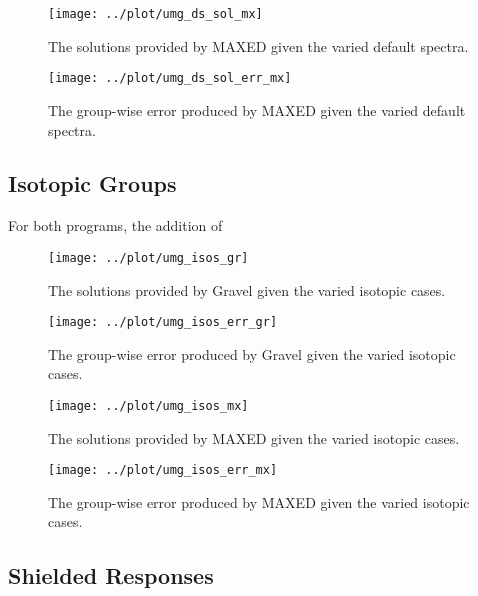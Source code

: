 \documentclass[journal]{IEEEtran}
\begin{document}
\begin{figure}[h!tb]
  \centering
  \texttt{[image: ../plot/umg\_ds\_sol\_mx]}
  \caption{The solutions provided by MAXED given the varied default spectra.}
  \label{fig:ds_sol_mx}
\end{figure}

\begin{figure}[h!tb]
  \centering
  \texttt{[image: ../plot/umg\_ds\_sol\_err\_mx]}
  \caption{The group-wise error produced by MAXED given the varied default spectra.}
  \label{fig:ds_err_mx}
\end{figure}


\subsection{Isotopic Groups}

For both programs, the addition of 



\begin{figure}[h!tb]
  \centering
  \texttt{[image: ../plot/umg\_isos\_gr]}
  \caption{The solutions provided by Gravel given the varied isotopic cases.}
  \label{fig:isos_gr}
\end{figure}

\begin{figure}[h!tb]
  \centering
  \texttt{[image: ../plot/umg\_isos\_err\_gr]}
  \caption{The group-wise error produced by Gravel given the varied isotopic cases.}
  \label{fig:isos_err_gr}
\end{figure}

\begin{figure}[h!tb]
  \centering
  \texttt{[image: ../plot/umg\_isos\_mx]}
  \caption{The solutions provided by MAXED given the varied  isotopic cases.}
  \label{fig:isos_mx}
\end{figure}

\begin{figure}[h!tb]
  \centering
  \texttt{[image: ../plot/umg\_isos\_err\_mx]}
  \caption{The group-wise error produced by MAXED given the varied  isotopic cases.}
  \label{fig:isos_err_mx}
\end{figure}

\subsection{Shielded Responses}
\end{document}
